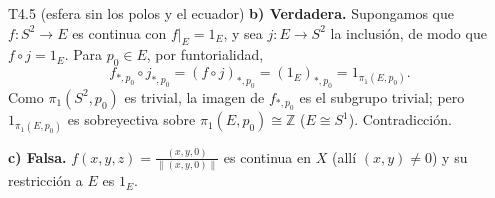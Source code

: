 \begin{ejercicio}{T4.5 (esfera sin los polos y el ecuador)}
\textbf{b) Verdadera.} Supongamos que $f \colon S^2 \to E$ es continua con $f|_E = 1_E$, y sea $j \colon E \to S^2$ la inclusión, de modo que $f \circ j = 1_E$. Para $p_0 \in E$, por funtorialidad,
\[ f_{*,p_0} \circ j_{*,p_0} = (f \circ j)_{*,p_0} = (1_E)_{*,p_0} = 1_{\pi_1(E,p_0)}. \]
Como $\pi_1(S^2,p_0)$ es trivial, la imagen de $f_{*,p_0}$ es el subgrupo trivial; pero $1_{\pi_1(E,p_0)}$ es sobreyectiva sobre $\pi_1(E,p_0) \cong \mathbb{Z}$ ($E \cong S^1$). Contradicción.

\textbf{c) Falsa.} $f(x,y,z) = \frac{(x,y,0)}{\|(x,y,0)\|}$ es continua en $X$ (allí $(x,y) \neq 0$) y su restricción a $E$ es $1_E$.
\end{ejercicio}
